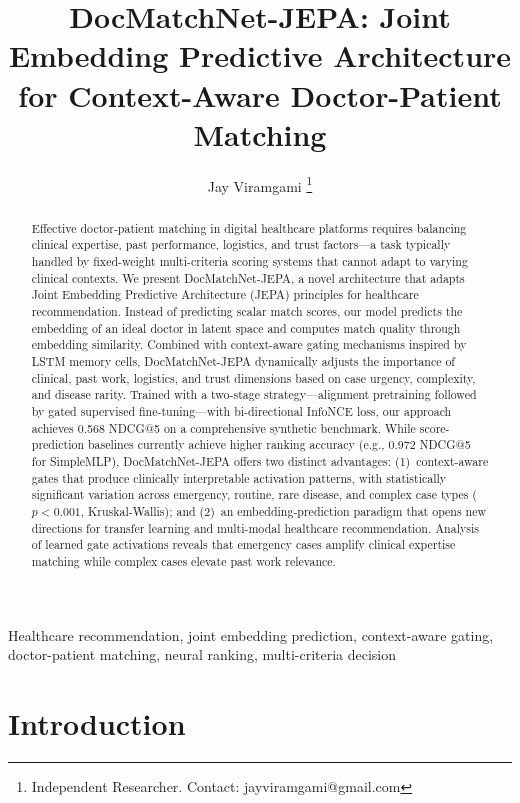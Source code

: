\documentclass[journal]{IEEEtran}
\title{DocMatchNet-JEPA: Joint Embedding Predictive Architecture \\
for Context-Aware Doctor-Patient Matching}
\author{Jay Viramgami%
\thanks{Independent Researcher. Contact: jayviramgami@gmail.com}}
\begin{document}
\maketitle

\begin{abstract}
Effective doctor-patient matching in digital healthcare platforms
requires balancing clinical expertise, past performance, logistics,
and trust factors---a task typically handled by fixed-weight
multi-criteria scoring systems that cannot adapt to varying clinical
contexts. We present DocMatchNet-JEPA, a novel architecture that
adapts Joint Embedding Predictive Architecture (JEPA) principles
for healthcare recommendation. Instead of predicting scalar match
scores, our model predicts the embedding of an ideal doctor in
latent space and computes match quality through embedding similarity.
Combined with context-aware gating mechanisms inspired by LSTM
memory cells, DocMatchNet-JEPA dynamically adjusts the importance
of clinical, past work, logistics, and trust dimensions based on
case urgency, complexity, and disease rarity. Trained with a
two-stage strategy---alignment pretraining followed by gated
supervised fine-tuning---with bi-directional InfoNCE loss, our
approach achieves 0.568 NDCG@5 on a comprehensive synthetic
benchmark. While score-prediction baselines currently achieve higher
ranking accuracy (e.g., 0.972 NDCG@5 for SimpleMLP), DocMatchNet-JEPA
offers two distinct advantages: (1)~context-aware gates that produce
clinically interpretable activation patterns, with statistically
significant variation across emergency, routine, rare disease, and
complex case types ($p<0.001$, Kruskal-Wallis); and (2)~an
embedding-prediction paradigm that opens new directions for
transfer learning and multi-modal healthcare recommendation.
Analysis of learned gate activations reveals that emergency cases
amplify clinical expertise matching while complex cases
elevate past work relevance.
\end{abstract}

\begin{IEEEkeywords}
Healthcare recommendation, joint embedding prediction,
context-aware gating, doctor-patient matching,
neural ranking, multi-criteria decision
\end{IEEEkeywords}

\section{Introduction}
\end{document}
